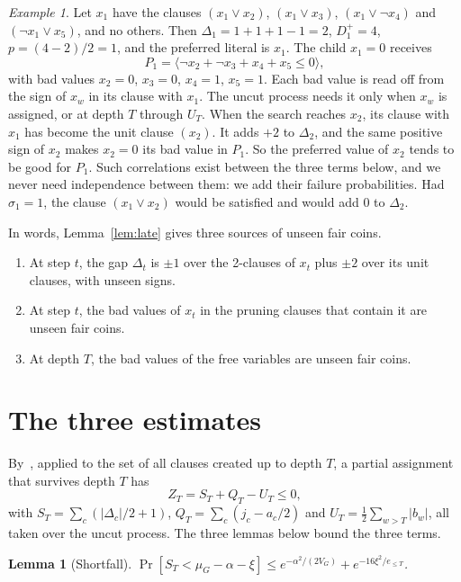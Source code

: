 \documentclass[11pt,a4paper]{article}
\newtheorem{lemma}[theorem]{Lemma}
\theoremstyle{remark}
\newtheorem{example}[theorem]{Example}
\begin{document}
\begin{example}\label{ex:tiny}
Let $x_1$ have the clauses $(x_1\vee x_2)$, $(x_1\vee x_3)$,
$(x_1\vee\neg x_4)$ and $(\neg x_1\vee x_5)$, and no others. Then
$\Delta_1=1+1+1-1=2$, $D^+_1=4$, $p=(4-2)/2=1$, and the preferred literal is
$x_1$. The child $x_1=0$ receives
\[
 P_1=\langle\neg x_2+\neg x_3+x_4+x_5\le0\rangle ,
\]
with bad values $x_2=0$, $x_3=0$, $x_4=1$, $x_5=1$. Each bad value is read
off from the sign of $x_w$ in its clause with $x_1$. The uncut process needs
it only when $x_w$ is assigned, or at depth $T$ through $U_T$. When the search
reaches $x_2$, its clause with $x_1$ has become the unit clause $(x_2)$. It
adds $+2$ to $\Delta_2$, and the same positive sign of $x_2$ makes $x_2=0$ its
bad value in $P_1$. So the preferred value of $x_2$ tends to be good for
$P_1$. Such correlations exist between the three terms below, and we never
need independence between them: we add their failure probabilities. Had
$\sigma_1=1$, the clause $(x_1\vee x_2)$ would be satisfied and would add $0$
to $\Delta_2$.
\end{example}

In words, Lemma~\ref{lem:late} gives three sources of unseen fair coins.
\begin{enumerate}
 \item At step $t$, the gap $\Delta_t$ is $\pm1$ over the 2-clauses of $x_t$
 plus $\pm2$ over its unit clauses, with unseen signs.
 \item At step $t$, the bad values of $x_t$ in the pruning clauses that
 contain it are unseen fair coins.
 \item At depth $T$, the bad values of the free variables are unseen fair
 coins.
\end{enumerate}

\section{The three estimates}\label{sec:estimates}

By~\cite[Lemma~2, Remark~3]{N7}, applied to the set of all clauses created up
to depth $T$, a partial assignment that survives depth $T$ has
\[
 Z_T=S_T+Q_T-U_T\le0,
\]
with $S_T=\sum_c(|\Delta_c|/2+1)$, $Q_T=\sum_c(j_c-a_c/2)$ and
$U_T=\frac12\sum_{w>T}|b_w|$, all taken over the uncut process. The three
lemmas below bound the three terms.

\begin{lemma}[Shortfall]\label{lem:S}
$\Pr[S_T<\mu_G-\alpha-\xi]\le e^{-\alpha^2/(2V_G)}+e^{-16\xi^2/e_{\le T}}$.
\end{lemma}
\end{document}

